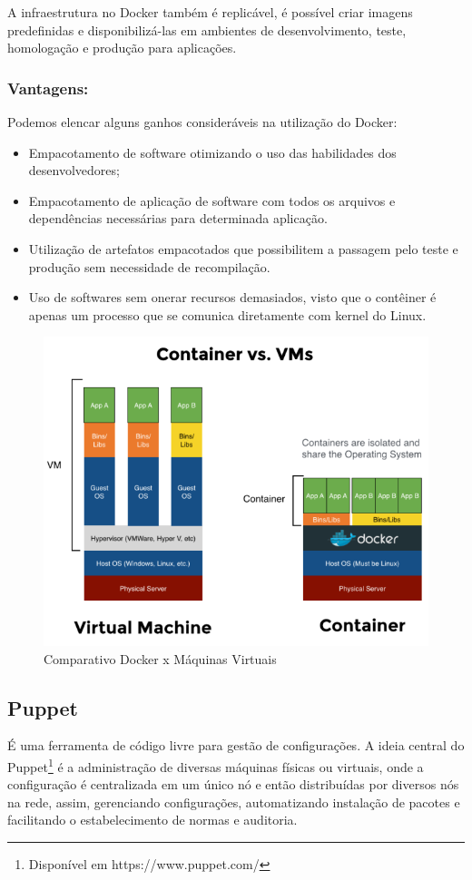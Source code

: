 A infraestrutura no Docker também é replicável, é possível criar imagens predefinidas e disponibilizá-las em ambientes de desenvolvimento, teste, homologação e produção para aplicações.


\subsubsection{Vantagens:}
Podemos elencar alguns ganhos consideráveis na utilização do Docker:
\begin{itemize}
\item Empacotamento de software otimizando o uso das habilidades dos desenvolvedores;
\item Empacotamento de aplicação de software com todos os arquivos e dependências necessárias para determinada aplicação.
\item Utilização de artefatos empacotados que possibilitem a passagem pelo teste e produção sem necessidade de recompilação.
\item Uso de softwares sem onerar recursos demasiados, visto que o contêiner é apenas um processo que se comunica diretamente com kernel do Linux.
\end{itemize}

\begin{figure} [htb]
	\centering
	\includegraphics[width=0.55\linewidth]{imagens/dockerXvm}
	\caption{Comparativo Docker x Máquinas Virtuais}
	\label{fig:dockerXvm}
\end{figure}

\subsection{Puppet}
É uma ferramenta de código livre para gestão de configurações. A ideia central do Puppet\footnote{Disponível em https://www.puppet.com/} é a administração de diversas máquinas físicas ou virtuais, onde a configuração é centralizada em um único nó e então distribuídas por diversos nós na rede, assim, gerenciando configurações, automatizando instalação de pacotes e facilitando o estabelecimento de normas e auditoria.

